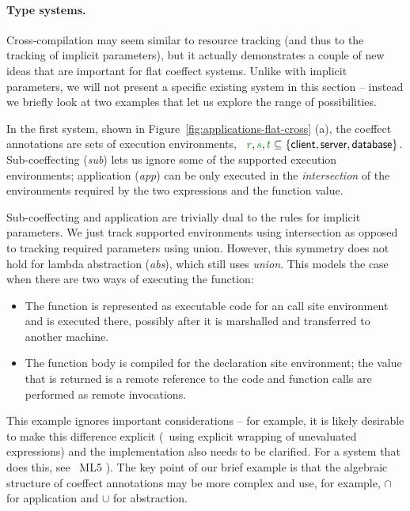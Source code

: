 \paragraph{Type systems.}

Cross-compilation may seem similar to resource tracking (and thus to the tracking of implicit 
parameters), but it actually demonstrates a couple of new ideas that are important for flat coeffect 
systems. Unlike with implicit parameters, we will not present a specific existing system in this 
section -- instead we briefly look at two examples that let us explore the range of possibilities. 

In the first system, shown in Figure~\ref{fig:applications-flat-cross} (a), the coeffect annotations
are sets of execution environments, \ie~$\cclrd{r}, \cclrd{s}, \cclrd{t} \subseteq \{ \ident{client},
\ident{server}, \ident{database} \}$. Sub-coeffecting (\emph{sub}) lets us ignore some of the supported 
execution environments; application (\emph{app}) can be only executed in the \emph{intersection} of the
environments required by the two expressions and the function value.

Sub-coeffecting and application are trivially dual to the rules for implicit parameters. We just track
supported environments using intersection as opposed to tracking required parameters using union.
However, this symmetry does not hold for lambda abstraction (\emph{abs}), which still uses \emph{union}.
This models the case when there are two ways of executing the function:
%
\begin{itemize}
\item The function is represented as executable code for an call site environment
  and is executed there, possibly after it is marshalled and transferred to another machine.
\vspace{-0.5em}
\item The function body is compiled for the declaration site environment; the value
  that is returned is a remote reference to the code and function calls are performed as remote invocations.
\end{itemize}
%
This example ignores important considerations -- for example, it is likely desirable to make this
difference explicit (\eg~using explicit wrapping of unevaluated expressions) and the implementation
also needs to be clarified. For a system that does this, see \eg~ML5 \cite{app-distributed-ml5}).
The key point of our brief example is that the algebraic structure of coeffect annotations may be more 
complex and use, for example, $\cap$ for application and $\cup$ for abstraction.

